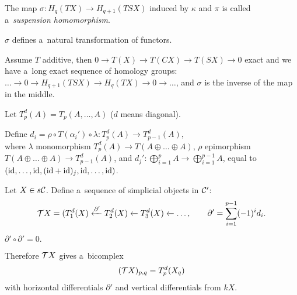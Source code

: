     \begin{definition}
        The map $\sigma:H_q(TX) \to H_{q+1}(TSX)$ induced by $\kappa$
        and $\pi$ is called a~{\em suspension homomorphism}.
    \end{definition}
    
    \begin{proposition}
        $\sigma$ defines a~natural transformation of functors.
    \end{proposition}
    
    \begin{proposition}
        Assume $T$ additive, then $0 \to T(X) \to T(CX) \to T(SX) \to 0$ exact
        and we have a~long exact sequence of homology groups:
        $\ldots \to 0 \to H_{q+1}(TSX) \to H_q(TX) \to 0 \to \ldots$,
        and $\sigma$ is the inverse of the map in the middle.
    \end{proposition}
    
    \begin{definition}
        Let $T_p^d(A) = T_p(A,\ldots,A)$ ($d$ means diagonal).
    \end{definition}
    
    \begin{definition}
        Define $d_i = \rho \circ T(\alpha_i') \circ \lambda:
        T_p^d(A) \to T_{p-1}^d(A),$ \\
        where $\lambda$ monomorphism $T_p^d(A) \to T(A \oplus \ldots \oplus A)$,
        $\rho$ epimorphism $T(A\oplus \ldots \oplus A) \to T_{p-1}^d(A)$,
        and $d_j':\bigoplus_{i=1}^p A \to \bigoplus_{i=1}^{p-1} A$,
        equal to $(\mathrm{id}, \ldots, \mathrm{id}, (\mathrm{id} + \mathrm{id})_j, \mathrm{id},\ldots, \mathrm{id})$.
    \end{definition}
    
    \begin{definition}
        Let $X \in s\mathcal{C}$. Define a~sequence of simplicial objects in $\mathcal{C}'$:
        $${\mathcal{T}}  X = (T_1^d(X) \xleftarrow{\partial'} T_2^d(X) 
        \xleftarrow{} T_3^d(X) \xleftarrow{} \ldots,
        \qquad \partial' = \sum_{i=1}^{p-1} (-1)^i d_i.$$
    \end{definition}
    
    \begin{remark}
        $\partial' \circ \partial' = 0.$
    \end{remark}
    
    \begin{corollary}
        Therefore ${\mathcal{T}}  X$ gives a~bicomplex $$({\mathcal{T}}  X)_{p,q} = T_p^d(X_q)$$
        with horizontal differentials $\partial'$ and vertical differentials 
        from $kX$.
    \end{corollary}
    
